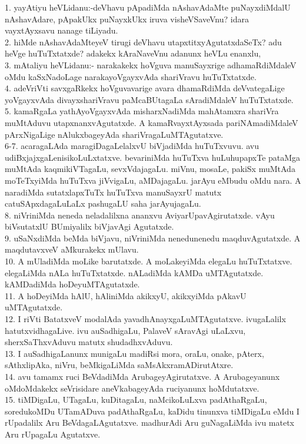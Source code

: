 \documentclass{article}
\begin{document}
1. yayAtiyu heVLidanu:-deVhavu pApadiMda nAshavAdaMte puNayxdiMdalU nAshavAdare, pApakUkx puNayxkUkx iruva visheVSaveVnu? idara vayxtAyxsavu nanage tiLiyadu.\\
2. hiMde nAshavAdaMteyeV tirugi deVhavu utapxtitxyAgutatxdaSeTx? adu heVge huTuTxtatxde? adakekx kAraNaveVnu adanunx heVLu enanxlu,\\
3. mAtaliyu heVLidanu:- narakakekx hoVguva manuSayxrige adhamaRdiMdaleV oMdu kaSxNadoLage narakayoVgayxvAda shariVravu huTuTxtatxde.\\
4. adeVriVti savxgaRkekx hoVguvavarige avara dhamaRdiMda deVvategaLige yoVgayxvAda divayxshariVravu paMcaBUtagaLa sAradiMdaleV huTuTxtatxde.\\
5. kamaRgaLa yathAyoVgayxvAda misharxNadiMda mahAtamxra shariVra muMtAduvu utapxnanxvAgutatxde. A kamaRvayxtAyxsada pariNAmadiMdaleV pArxNigaLige nAlukxbageyAda shariVragaLuMTAgutatxve.\\
6-7. acaragaLAda maragiDagaLelalxvU biVjadiMda huTuTxvuvu. avu udiBxjajxgaLenisikoLuLxtatxve. bevariniMda huTuTxva huLuhupapxTe pataMga muMtAda kaqmikiVTagaLu, sevxVdajagaLu. miVnu, mosaLe, pakiSx muMtAda moTeTxyiMda huTuTxva jiVvigaLu, aMDajagaLu. jarAyu eMbudu oMdu nara. A naradiMda sutatxlapxTuTx huTuTxva manuSayxrU matutx catuSApxdagaLuLaLx pashugaLU saha jarAyujagaLu.\\
8. niVriniMda neneda neladalilxna ananxvu AviyarUpavAgirutatxde. vAyu biVsutatxlU BUmiyalilx biVjavAgi Agutatxde.\\
9. uSaNxdiMda beMda biVjavu, niVriniMda nenedunenedu maqduvAgutatxde. A maqdutavxveV aMkurakekx mUlavu.\\
10. A mUladiMda moLike barutatxde. A moLakeyiMda elegaLu huTuTxtatxve. elegaLiMda nALa huTuTxtatxde. nALadiMda kAMDa uMTAgutatxde. kAMDadiMda hoDeyuMTAgutatxde.\\
11. A hoDeyiMda hAlU, hAliniMda akikxyU, akikxyiMda pAkavU uMTAgutatxde.\\
12. I riVti BatatxveV modalAda yavadhAnayxgaLuMTAgutatxve. ivugaLalilx hatutxvidhagaLive. ivu auSadhigaLu, PalaveV sAravAgi uLaLxvu, sherxSaThxvAduvu matutx shudadhxvAduvu.\\
13. I auSadhigaLanunx munigaLu madiRsi mora, oraLu, onake, pAterx, sAthxlipAka, niVru, beMkigaLiMda saMsAkxramADirutAtxre.\\
14. avu tamamx ruci BeVdadiMda ArubageyAgirutatxve. A Arubageyanunx oMdoMdakekx seVrisidare aneVkabageyAda ruciyanunx hoMdutatxve.\\
15. tiMDigaLu, UTagaLu, kuDitagaLu, naMcikoLuLxva padAthaRgaLu, soredukoMDu UTamADuva padAthaRgaLu, kaDidu tinunxva tiMDigaLu eMdu I rUpadalilx Aru BeVdagaLAgutatxve. madhurAdi Aru guNagaLiMda ivu matetx Aru rUpagaLu Agutatxve.\\
\end{document}
